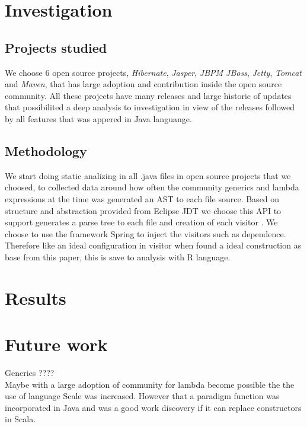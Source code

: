 \documentclass{sig-alternate-05-2015}
\begin{document}

\section{Investigation}

\subsection{Projects studied}
We choose 6 open source projects, \textit{Hibernate}, \textit{Jasper}, \textit{JBPM JBoss}, \textit{Jetty}, \textit{Tomcat} and \textit{Maven}, that has large adoption and contribution inside the open source community. All these projects have many releases and large historic of updates that possibilited a deep analysis to investigation in view of the releases followed by all features that was appered in Java languange.

\subsection{Methodology}
We start doing static analizing in all .java files in open source projects that we choosed, to collected data around how often the community generics and lambda expressions at the time was generated an AST to each file source. Based on structure and abstraction provided from Eclipse JDT we choose this API to support generates a parse tree to each file and creation of each visitor \cite{Gamma:1995:DPE:186897}. We choose to use the framework Spring to inject the visitors such as dependence. Therefore like an ideal configuration in visitor \cite{Gamma:1995:DPE:186897} when found a ideal construction as base from this paper, this is save to analysis with R language.
  

\section{Results}

\section{Future work}
Generics ????\\
Maybe with a large adoption of community for lambda become possible the the use of language Scale was increased. However that a paradigm function was incorporated in Java and was a good work discovery if it can replace constructors in Scala.
\end{document}
